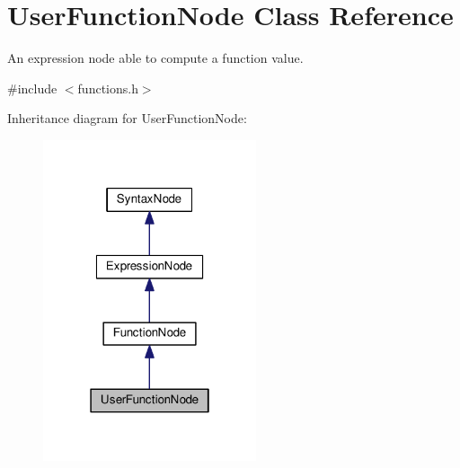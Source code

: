 \hypertarget{classUserFunctionNode}{}\section{User\+Function\+Node Class Reference}
\label{classUserFunctionNode}


An expression node able to compute a function value.  




{\ttfamily \#include $<$functions.\+h$>$}



Inheritance diagram for User\+Function\+Node\+:
\nopagebreak
\begin{figure}[H]
\begin{center}
\leavevmode
\includegraphics[width=178pt]{d9/d67/classUserFunctionNode__inherit__graph}
\end{center}
\end{figure}


